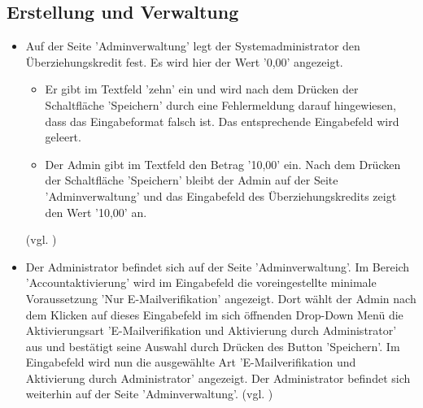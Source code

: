 \documentclass[a4paper]{scrreprt}
\begin{document}
		\subsection{Erstellung und Verwaltung}
			\begin{itemize}
				\item {} 
				Auf der Seite 'Adminverwaltung' legt der Systemadministrator den Überziehungskredit fest. Es wird hier der Wert '0,00' angezeigt.
					\begin{itemize}
						\item Er gibt im Textfeld 'zehn' ein und wird nach dem Drücken der Schaltfläche 'Speichern' durch eine Fehlermeldung darauf hingewiesen, dass das Eingabeformat falsch ist. Das entsprechende Eingabefeld wird geleert.
						
						\item Der Admin gibt im Textfeld den Betrag '10,00' ein. Nach dem Drücken der Schaltfläche 'Speichern' bleibt der Admin auf der Seite 'Adminverwaltung' und das Eingabefeld des Überziehungskredits zeigt den Wert '10,00' an.
					\end{itemize}
				(vgl. )
				
				\item {}
				 Der Administrator befindet sich auf der Seite 'Adminverwaltung'. Im Bereich 'Accountaktivierung' wird im Eingabefeld die voreingestellte minimale Voraussetzung 'Nur E-Mailverifikation' angezeigt. Dort wählt der Admin nach dem Klicken auf dieses Eingabefeld im sich öffnenden Drop-Down Menü die Aktivierungsart 'E-Mailverifikation und Aktivierung durch Administrator' aus und bestätigt seine Auswahl durch Drücken des Button 'Speichern'. Im Eingabefeld wird nun die ausgewählte Art 'E-Mailverifikation und Aktivierung durch Administrator' angezeigt. Der Administrator befindet sich weiterhin auf der Seite 'Adminverwaltung'. (vgl. )
				

\end{itemize}
\end{document}
